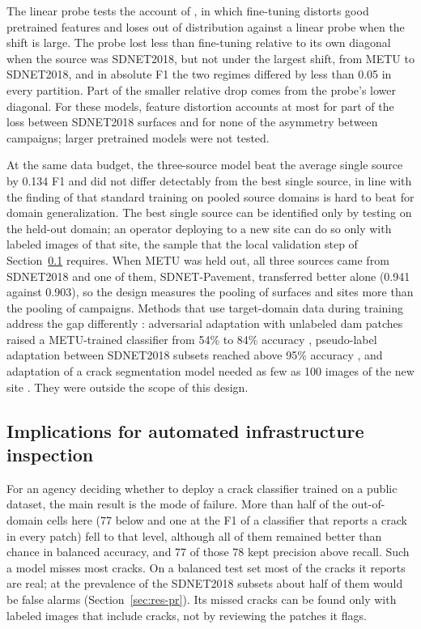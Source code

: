 \documentclass[pdflatex,sn-apa]{sn-jnl}
\begin{document}
The linear probe tests the account of \citet{kumar2022}, in which fine-tuning distorts good pretrained features and loses out of distribution against a linear probe when the shift is large. The probe lost less than fine-tuning relative to its own diagonal when the source was SDNET2018, but not under the largest shift, from METU to SDNET2018, and in absolute F1 the two regimes differed by less than 0.05 in every partition. Part of the smaller relative drop comes from the probe's lower diagonal. For these models, feature distortion accounts at most for part of the loss between SDNET2018 surfaces and for none of the asymmetry between campaigns; larger pretrained models were not tested.

At the same data budget, the three-source model beat the average single source by 0.134 F1 and did not differ detectably from the best single source, in line with the finding of \citet{gulrajani2021} that standard training on pooled source domains is hard to beat for domain generalization. The best single source can be identified only by testing on the held-out domain; an operator deploying to a new site can do so only with labeled images of that site, the sample that the local validation step of Section~\ref{sec:disc-implications} requires. When METU was held out, all three sources came from SDNET2018 and one of them, SDNET-Pavement, transferred better alone (0.941 against 0.903), so the design measures the pooling of surfaces and sites more than the pooling of campaigns. Methods that use target-domain data during training address the gap differently \citep{wang2018}: adversarial adaptation with unlabeled dam patches raised a METU-trained classifier from 54\% to 84\% accuracy \citep{santos2022}, pseudo-label adaptation between SDNET2018 subsets reached above 95\% accuracy \citep{zhu2026concracknet}, and adaptation of a crack segmentation model needed as few as 100 images of the new site \citep{chun2024}. They were outside the scope of this design.

\subsection{Implications for automated infrastructure inspection}\label{sec:disc-implications}

For an agency deciding whether to deploy a crack classifier trained on a public dataset, the main result is the mode of failure. More than half of the out-of-domain cells here (77 below and one at the F1 of a classifier that reports a crack in every patch) fell to that level, although all of them remained better than chance in balanced accuracy, and 77 of those 78 kept precision above recall. Such a model misses most cracks. On a balanced test set most of the cracks it reports are real; at the prevalence of the SDNET2018 subsets about half of them would be false alarms (Section~\ref{sec:res-pr}). Its missed cracks can be found only with labeled images that include cracks, not by reviewing the patches it flags.
\end{document}
